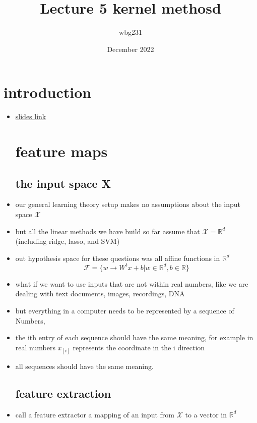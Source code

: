 \documentclass{article}
\title{Lecture 5 kernel methosd}
\author{wbg231 }
\date{December 2022}
\begin{document}
\maketitle

\section*{introduction}
\begin{itemize}
\item \href{https://nyu-ds1003.github.io/mlcourse/2023/lectures/lec05/05.pdf}{slides link}
\section{feature maps}
\subsection{the input space X}
\item our general learning theory setup makes no assumptions about the input space $\mathcal{X}$
\item but all the linear methods we have build so far assume that $\mathcal{X}=\mathbb{R}^{d}$  (including ridge, lasso, and SVM)
\item out hypothesis space for these questions was all affine functions in $\mathbb{R}^{d}$ $$\mathcal{F}=\{w\rightarrow W^tx+b|w\in \mathbb{R}^{d}, b\in \mathbb{R} \}$$
\item what if we want to use inputs that are not within real numbers, like we are dealing with text documents, images, recordings, DNA
\item but everything in a computer needs to be represented by a sequence of Numbers,
\item the ith entry of each sequence should have the same meaning, for example in real numbers $x_[i]$ represents the coordinate in the i direction
\item all sequences should have the same meaning.
\subsection{feature extraction}
\item call a feature extractor a mapping of an input from $\mathcal{X}$ to a vector in $\mathbb{R}^{d}$  

\end{itemize}
\end{document}
